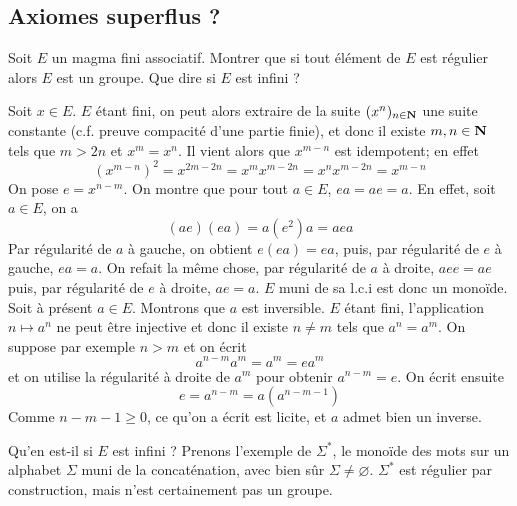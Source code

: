 \subsection{Axiomes superflus ?}
\begin{exercice}
    Soit $E$ un magma fini associatif. Montrer que si tout élément de $E$ est régulier alors $E$ est un groupe. Que dire si $E$ est infini ?
\end{exercice}

\begin{correction}
   Soit $x\in E$. $E$ étant fini, on peut alors extraire de la suite $(x^n)_{n\in\operatorname{\mathbf{N}}}$ une suite constante (c.f. preuve compacité d'une partie finie), et donc il existe $m,n \in\operatorname{\mathbf{N}}$ tels que $m>2n$ et $x^m=x^n$. Il vient alors que $x^{m-n}$ est idempotent; en effet \[(x^{m-n})^2=x^{2m-2n}=x^mx^{m-2n}=x^nx^{m-2n}=x^{m-n}\]
   On pose $e=x^{n-m}$. On montre que pour tout $a\in E$, $ea=ae=a$. En effet, soit $a\in E$, on a \[(ae)(ea)=a(e^2)a=aea\]
   Par régularité de $a$ à gauche, on obtient $e(ea)=ea$, puis, par régularité de $e$ à gauche, $ea=a$. On refait la même chose, par régularité de $a$ à droite, $aee=ae$ puis, par régularité de $e$ à droite, $ae=a$. $E$ muni de sa l.c.i est donc un monoïde.\\
   Soit à présent $a\in E$. Montrons que $a$ est inversible. $E$ étant fini, l'application $n\mapsto a^n$ ne peut être injective et donc il existe $n\neq m$ tels que $a^n=a^m$. On suppose par exemple $n>m$ et on écrit \[a^{n-m}a^m=a^m=ea^m\]
   et on utilise la régularité à droite de $a^m$ pour obtenir $a^{n-m}=e$. On écrit ensuite \[e=a^{n-m}=a(a^{n-m-1})\]
   Comme $n-m-1\geq 0$, ce qu'on a écrit est licite, et $a$ admet bien un inverse.

   Qu'en est-il si $E$ est infini ? Prenons l'exemple de $\Sigma^*$, le monoïde des mots sur un alphabet $\Sigma$ muni de la concaténation, avec bien sûr $\Sigma\neq\varnothing$.
   $\Sigma^*$  est régulier par construction, mais n'est certainement pas un groupe.
\end{correction}